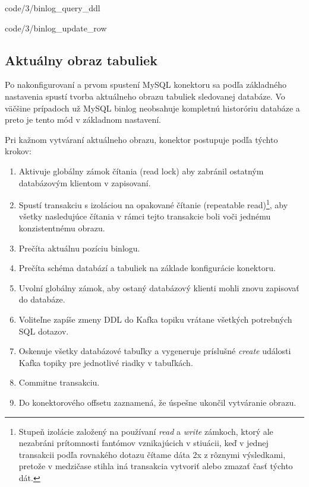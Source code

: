
            {code/3/binlog_query_ddl}


            {code/3/binlog_update_row}
            
\subsection{Aktuálny obraz tabuliek} \label{debezium:conistent_snapshot}
Po nakonfigurovaní a prvom spustení MySQL konektoru sa podľa základného nastavenia spustí tvorba aktuálneho obrazu tabuliek sledovanej databáze. Vo väčšine prípadoch už MySQL binlog neobsahuje kompletnú historóriu databáze a preto je tento mód v základnom nastavení. 

Pri kažnom vytváraní aktuálneho obrazu, konektor postupuje podľa týchto krokov\cite{debezium:consistent_snapshot}:
\begin{enumerate}
\item Aktivuje globálny zámok čítania (read lock) aby zabránil ostatným databázovým klientom v zapisovaní.
\item Spustí transakciu s izoláciou na opakované čítanie (repeatable read)\footnote{Stupeň izolácie založený na používaní \textit{read} a \textit{write} zámkoch, ktorý ale nezabráni prítomnosti fantómov vznikajúcich v stiuácii, keď v jednej transakcii podľa rovnakého dotazu čítame dáta 2x z rôznymi výsledkami, pretože v medzičase stihla iná transakcia vytvoriť alebo zmazať časť týchto dát.}, aby všetky nasledujúce čítania v rámci tejto transakcie boli voči jednému konzistentnému obrazu.
\item Prečíta aktuálnu pozíciu binlogu.
\item Prečíta schéma databází a tabuliek na základe konfigurácie konektoru.
\item Uvolní globálny zámok, aby ostaný databázový klienti mohli znovu zapisovať do databáze.
\item Voliteľne zapíše zmeny DDL do Kafka topiku vrátane všetkých potrebných SQL dotazov.
\item Oskenuje všetky databázové tabuľky a vygeneruje príslušné \textit{create} události  Kafka topiky pre jednotlivé riadky v tabuľkách.
\item Commitne transakciu.
\item Do konektorového offsetu zaznamená, že úspešne ukončil vytváranie obrazu.
\end{enumerate}

